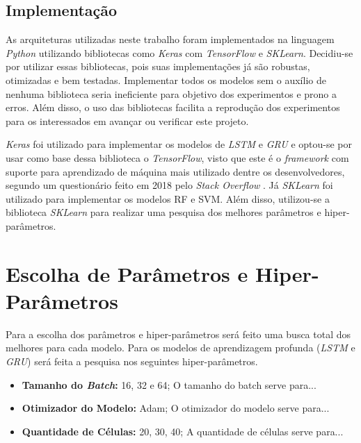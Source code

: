 \subsection{Implementação}

As arquiteturas utilizadas neste trabalho foram implementados na linguagem \textit{Python} utilizando bibliotecas como \textit{Keras} com \textit{TensorFlow} e \textit{SKLearn}. Decidiu-se por utilizar essas bibliotecas, pois suas implementações já são robustas, otimizadas e bem testadas. Implementar todos os modelos sem o auxílio de nenhuma biblioteca seria ineficiente para objetivo dos experimentos e prono a erros. Além disso, o uso das bibliotecas facilita a reprodução dos experimentos para os interessados em avançar ou verificar este projeto.

\textit{Keras} foi utilizado para implementar os modelos de \textit{\acrshort{LSTM}} e \textit{\acrshort{GRU}} e optou-se por usar como base dessa biblioteca o \textit{TensorFlow}, visto que este é o \textit{framework} com suporte para aprendizado de máquina mais utilizado dentre os desenvolvedores, segundo um questionário feito em 2018 pelo \textit{Stack Overflow} \cite{stack_2018}. Já \textit{SKLearn} foi utilizado para implementar os modelos \acrshort{RF} e \acrshort{SVM}. Além disso, utilizou-se a biblioteca \textit {SKLearn} para realizar uma pesquisa dos melhores parâmetros e hiper-parâmetros.

\section{Escolha de Parâmetros e Hiper-Parâmetros}

Para a escolha dos parâmetros e hiper-parâmetros será feito uma busca total dos melhores para cada modelo. Para os modelos de aprendizagem profunda (\textit{\acrshort{LSTM}} e \textit{\acrshort{GRU}}) será feita a pesquisa nos seguintes hiper-parâmetros.


\begin{itemize}
    \item \textbf{Tamanho do \textit{Batch}:} 16, 32 e 64; \newline
    O tamanho do batch serve para...
    \item \textbf{Otimizador do Modelo:} Adam; \newline
    O otimizador do modelo serve para...
    \item \textbf{Quantidade de Células:} 20, 30, 40; \newline
    A quantidade de células serve para...
\end{itemize}


